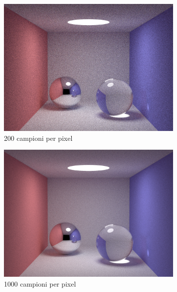 \begin{figure}[tb]
\begin{subfigure}[c]{0.4\linewidth}
	\includegraphics[width=\linewidth]{../assets/appendixD_result_200.png}
	\caption{200 campioni per pixel}
    \end{subfigure}\hfill
    \begin{subfigure}[c]{0.4\linewidth}
	\centering
	\includegraphics[width=\linewidth]{../assets/appendixD_result_1000.png}
	\caption{1000 campioni per pixel}
    \end{subfigure}\hfill
    \begin{subfigure}[c]{0.4\linewidth}
	\centering

\end{subfigure}
\end{figure}
